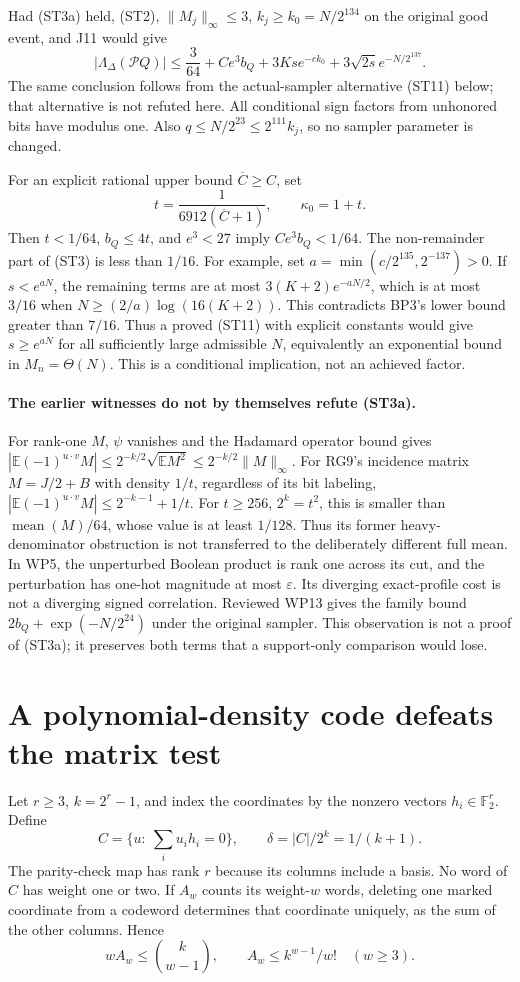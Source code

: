 \documentclass[11pt]{article}
\newcommand{\E}{\mathbb E}
\newcommand{\Pp}{\mathcal P}
\begin{document}
Had (ST3a) held, (ST2), $\|M_j\|_\infty\le3$,
$k_j\ge k_0=N/2^{134}$ on the original good event, and J11 would give
\[
 |\Lambda_\Delta(\Pp Q)|
 \le\frac3{64}+Ce^3b_Q+3Ks e^{-ck_0}
                  +3\sqrt{2s}e^{-N/2^{137}}.             \tag{ST3}
\]
The same conclusion follows from the actual-sampler alternative
(ST11) below; that alternative is not refuted here.
All conditional sign factors from unhonored bits have modulus one.
Also $q\le N/2^{23}\le2^{111}k_j$, so no sampler parameter is changed.

For an explicit rational upper bound $\overline C\ge C$, set
\[
 t=\frac1{6912(\overline C+1)},\qquad \kappa_0=1+t.
\]
Then $t<1/64$, $b_Q\le4t$, and $e^3<27$ imply
$Ce^3b_Q<1/64$. The non-remainder part of (ST3) is less than $1/16$.
For example, set
$a=\min(c/2^{135},2^{-137})>0$.
If $s<e^{aN}$, the remaining terms are at most
$3(K+2)e^{-aN/2}$, which is at most $3/16$ when
$N\ge(2/a)\log(16(K+2))$.
This contradicts BP3's lower bound greater than $7/16$.
Thus a proved (ST11) with explicit constants would give
$s\ge e^{aN}$ for all sufficiently large admissible $N$,
equivalently an exponential bound in $M_n=\Theta(N)$.
This is a conditional implication, not an achieved factor.

\paragraph{The earlier witnesses do not by themselves refute (ST3a).}
For rank-one $M$, $\psi$ vanishes and the Hadamard operator bound gives
$|\E(-1)^{u\cdot v}M|\le2^{-k/2}\sqrt{\E M^2}
\le2^{-k/2}\|M\|_\infty$.
For RG9's incidence matrix $M=J/2+B$ with density $1/t$,
regardless of its bit labeling,
$|\E(-1)^{u\cdot v}M|\le2^{-k-1}+1/t$.
For $t\ge256$, $2^k=t^2$, this is smaller than
$\operatorname{mean}(M)/64$, whose value is at least $1/128$.
Thus its former heavy-denominator obstruction is not transferred
to the deliberately different full mean.
In WP5, the unperturbed Boolean product is rank one across its cut,
and the perturbation has one-hot magnitude at most $\varepsilon$.
Its diverging exact-profile cost is not a diverging signed correlation.
Reviewed WP13 gives the family bound
$2b_Q+\exp(-N/2^{24})$ under the original sampler.
This observation is not a proof of (ST3a); it preserves both terms
that a support-only comparison would lose.

\section{A polynomial-density code defeats the matrix test}
Let $r\ge3$, $k=2^r-1$, and index the coordinates by the nonzero
vectors $h_i\in\mathbb F_2^r$. Define
\[
 C=\{u:\ \textstyle\sum_i u_i h_i=0\},\qquad
 \delta=|C|/2^k=1/(k+1).
\]
The parity-check map has rank $r$ because its columns include a basis.
No word of $C$ has weight one or two.
If $A_w$ counts its weight-$w$ words, deleting one marked coordinate
from a codeword determines that coordinate uniquely, as the sum of
the other columns. Hence
\[
 w A_w\le {k\choose w-1},\qquad
 A_w\le k^{w-1}/w!\quad(w\ge3).                          \tag{ST4}
\]
\end{document}
